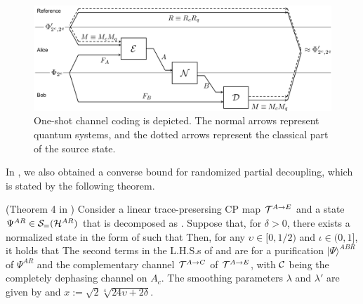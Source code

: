 \documentclass[journal]{IEEEtran}
\begin{document}
\begin{figure}[th]
\begin{center}
\includegraphics[bb={0 0 1141 404}, scale=0.37]{figure7.pdf}
\end{center}
\caption{
One-shot channel coding is depicted.
The normal arrows represent quantum systems, and the dotted arrows represent the classical part of the source state.
}
\label{fig:oneshotchannelcoding}
\end{figure}


In \cite{wakakuwa2019one}, we also obtained a converse bound for randomized partial decoupling, which is stated by the following theorem.

(Theorem 4 in \cite{wakakuwa2019one})
Consider a linear trace-presersing CP map ${\mathcal T}^{A \rightarrow E}$ and
a state $\Psi^{AR}\in{\mathcal S}_=({\mathcal H}^{AR})$ that is decomposed as .
Suppose that, for $\delta>0$, there exists a normalized state in the form of
such that
Then, for any $\upsilon\in[0,1/2)$ and $\iota\in(0,1]$, it holds that
The second terms in the L.H.S.s of  and  are for a purification $|\Psi\rangle^{ABR}$ of $\Psi^{AR}$ and the complementary channel ${\mathcal T}^{A \rightarrow C}$ of ${\mathcal T}^{A \rightarrow E}$,
with ${\mathcal C}$ being the completely dephasing channel on $A_c$.
The smoothing parameters $\lambda$ and $\lambda'$ are given by
and $x:=\sqrt{2}\sqrt[4]{24\upsilon+2\delta}$.
\ethm
\end{document}
